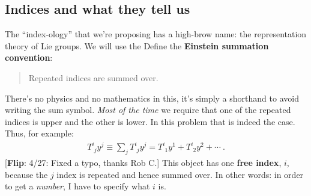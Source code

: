 \documentclass[12pt]{article}
\newcommand{\flip}[1]{{\color{red} [\textbf{Flip}: {#1}]}}
\begin{document}







\subsection{Indices and what they tell us}

The ``index-ology'' that we're proposing has a high-brow name: the representation theory of Lie groups. We will use the Define the \textbf{Einstein summation convention}:
\begin{quote}
	Repeated indices are summed over. 
\end{quote}
 There's no physics and no mathematics in this, it's simply a shorthand to avoid writing the sum symbol. \emph{Most of the time} we require that one of the repeated indices is upper and the other is lower. In this problem that is indeed the case. Thus, for example:
 \begin{align}
 	T^{i}_{\phantom{i}j}y^j \equiv \sum_j T^{i}_{\phantom{i}j}y^j = T^{i}_{\phantom{i}1}y^1 + T^{i}_{\phantom{i}2}y^2 + \cdots \ .
 \end{align}
 \flip{4/27: Fixed a typo, thanks Rob C.}
 This object has one \textbf{free index}, $i$, because the $j$ index is repeated and hence summed over. In other words: in order to get a \emph{number}, I have to specify what $i$ is. 
\end{document}
